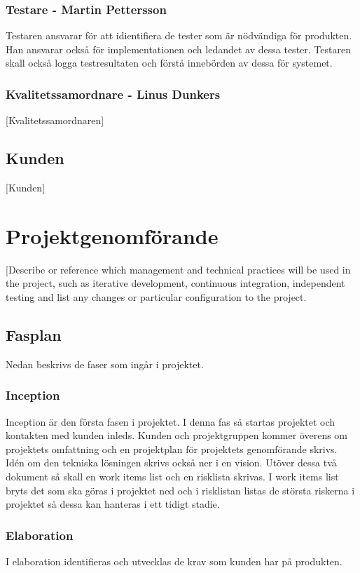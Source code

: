 \subsubsection*{Testare - Martin Pettersson}
Testaren ansvarar för att idientifiera de tester som är nödvändiga för produkten. Han ansvarar också för implementationen och ledandet av dessa tester. Testaren skall också logga testresultaten och förstå innebörden av dessa för systemet.

\subsubsection*{Kvalitetssamordnare - Linus Dunkers}
[Kvalitetssamordnaren]

\subsection{Kunden}
[Kunden]

\section{Projektgenomförande}
[Describe or reference which management and technical practices will be used in the project, such as iterative development, continuous integration, independent testing and list any changes or particular configuration to the project.

\subsection{Fasplan}
Nedan beskrivs de faser som ingår i projektet.

\subsubsection*{Inception}
Inception är den första fasen i projektet. I denna fas så startas projektet och kontakten med kunden inleds. Kunden och projektgruppen kommer överens om projektets omfattning och en projektplan för projektets genomförande skrivs. Idén om den tekniska lösningen skrivs också ner i en vision. Utöver dessa två dokument så skall en work items list och en risklista skrivas. I work items list bryts det som ska göras i projektet ned och i risklistan listas de största riskerna i projektet så dessa kan hanteras i ett tidigt stadie.

\subsubsection*{Elaboration}
I elaboration identifieras och utvecklas de krav som kunden har på produkten. 


